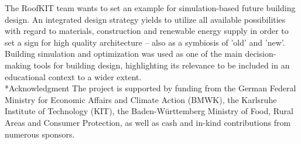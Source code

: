 \documentclass[twocolumn, a4paper,10pt]{article}
\makeatletter
\renewcommand\section{\@startsection{section}{1}{\z@}{3pt}{3pt}{\normalfont\large\bfseries}}
\makeatother
\begin{document}
The RoofKIT team wants to set an example for simulation-based future building design. An integrated design strategy yields to utilize all available possibilities with regard to materials, construction and renewable energy supply in order to set a sign for high quality architecture – also as a symbiosis of 'old' and 'new'. Building simulation and optimization was used as one of the main decision-making tools for building design, highlighting its relevance to be included in an educational context to a wider extent.\\

\section*{Acknowledgment}
The project is supported by funding from the German Federal Ministry for Economic Affairs and Climate Action (BMWK), the Karlsruhe Institute of Technology (KIT), the Baden-Württemberg Ministry of Food, Rural Areas and Consumer Protection, as well as cash and in-kind contributions from numerous sponsors.\\


\end{document}
